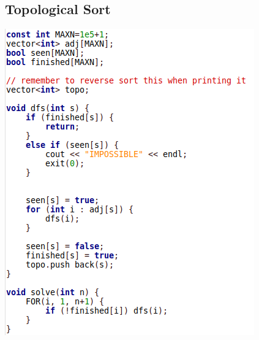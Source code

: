 \documentclass[11pt,twocolumn]{article}
\begin{document}
\subsection{Topological Sort}
\includegraphics[scale=0.5]{topological}
\end{document}
